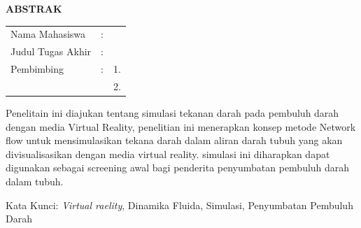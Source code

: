 \begin{center}
  \large\textbf{ABSTRAK}
\end{center}


\vspace{2ex}

\begingroup
\setlength{\tabcolsep}{0pt}

\noindent
\begin{tabularx}{\textwidth}{l >{\centering}m{2em} X}
  Nama Mahasiswa    & : & \name{}         \\

  Judul Tugas Akhir & : & \tatitle{}      \\

  Pembimbing        & : & 1. \advisor{}   \\
                    &   & 2. \coadvisor{} \\
\end{tabularx}
\endgroup

Penelitain ini diajukan tentang simulasi tekanan darah pada pembuluh darah dengan media Virtual Reality, penelitian ini menerapkan konsep metode Network flow untuk mensimulasikan tekana darah dalam aliran darah tubuh yang akan divisualisasikan dengan media virtual reality. simulasi ini diharapkan dapat digunakan sebagai screening awal bagi penderita penyumbatan pembuluh darah dalam tubuh.


Kata Kunci: \emph{Virtual raelity}, Dinamika Fluida, Simulasi, Penyumbatan Pembuluh Darah
